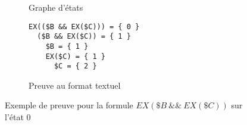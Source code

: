 \begin{figure}[H]
\centering
\begin{subfigure}[b]{.4\textwidth}
\centering
{}
\caption{Graphe d'états}
\end{subfigure}
\begin{subfigure}[b]{.4\textwidth}
\centering
\begin{minipage}{0.68\linewidth}
\begin{verbatim}
EX(($B && EX($C))) = { 0 }
  ($B && EX($C)) = { 1 }
    $B = { 1 }
    EX($C) = { 1 }
      $C = { 2 }
\end{verbatim}
\end{minipage}
\caption{Preuve au format textuel}
\end{subfigure}
\caption{Exemple de preuve pour la formule $EX(\$B~\&\&~EX(\$C))$ sur l'état 0}
\label{fig:PreuveAffichageTextuel}
\end{figure}
